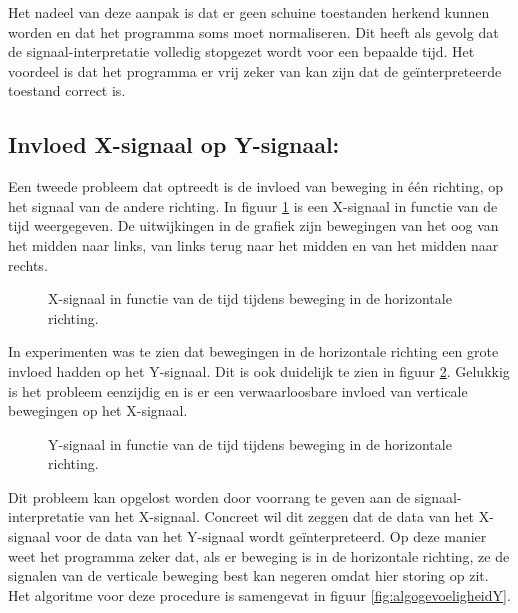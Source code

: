\documentclass{article}
\newcommand{\figwidth}{0.75\linewidth}
\begin{document}
Het nadeel van deze aanpak is dat er geen schuine toestanden herkend kunnen worden en dat het programma soms moet normaliseren. Dit heeft als gevolg dat de signaal-interpretatie volledig stopgezet wordt voor een bepaalde tijd. Het voordeel is dat het programma er vrij zeker van kan zijn dat de ge\"interpreteerde toestand correct is.

\subsection{Invloed X-signaal op Y-signaal:}
Een tweede probleem dat optreedt is de invloed van beweging in \'e\'en richting, op het signaal van de andere richting. In figuur \ref{fig:grafiekgevoeligheidY_2} is een X-signaal in functie van de tijd weergegeven. De uitwijkingen in de grafiek zijn bewegingen van het oog van het midden naar links, van links terug naar het midden en van het midden naar rechts.
\begin{figure}[H]
	\centering
	\caption{X-signaal in functie van de tijd tijdens beweging in de horizontale richting.}
	\label{fig:grafiekgevoeligheidY_2}
\end{figure}
In experimenten was te zien dat bewegingen in de horizontale richting een grote invloed hadden op het Y-signaal. Dit is ook duidelijk te zien in figuur \ref{fig:grafiekgevoeligheidY_1}. Gelukkig is het probleem eenzijdig en is er een verwaarloosbare invloed van verticale bewegingen op het X-signaal.
\begin{figure}[H]	
	\centering
	\caption{Y-signaal in functie van de tijd tijdens beweging in de horizontale richting.}
	\label{fig:grafiekgevoeligheidY_1}
\end{figure}
Dit probleem kan opgelost worden door voorrang te geven aan de signaal-interpretatie van het X-signaal. Concreet wil dit zeggen dat de data van het X-signaal voor de data van het Y-signaal wordt ge\"interpreteerd. Op deze manier weet het programma zeker dat, als er beweging is in de horizontale richting, ze de signalen van de verticale beweging best kan negeren omdat hier storing op zit. Het algoritme voor deze procedure is samengevat in figuur \ref{fig:algogevoeligheidY}.
\end{document}

